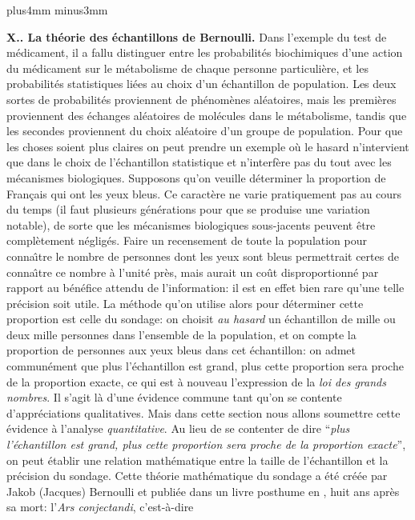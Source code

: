 \vskip8mm plus4mm minus3mm 
 
{\bf X.. La th\'eorie des \'echantillons de Bernoulli.}
\medskip 
Dans l'exemple du test de m\'edicament, il a fallu distinguer entre les 
pro\-ba\-bi\-lit\'es biochimiques d'une action du m\'edicament sur le 
m\'etabolisme de chaque personne particuli\`ere, et les probabilit\'es 
statistiques li\'ees au choix d'un \'echantillon de population. Les deux
sortes de probabilit\'es proviennent de ph\'enom\`enes al\'eatoires, mais
les premi\`eres proviennent des \'echanges al\'eatoires de mol\'ecules
dans le m\'etabolisme, tandis que les secondes pro\-vien\-nent du choix 
al\'eatoire d'un groupe de population. 
\medskip 
Pour que les choses soient plus claires on peut prendre un exemple o\`u
le hasard n'intervient que dans le choix de l'\'echantillon statistique et 
n'interf\`ere pas du tout avec les m\'ecanismes biologiques. Supposons
qu'on veuille d\'eterminer la proportion de Fran\c{c}ais qui ont les yeux 
bleus. Ce caract\`ere ne varie pratiquement pas au cours du temps (il
faut plusieurs g\'en\'erations pour que se produise une variation 
notable), de sorte que les m\'ecanismes biologiques sous-jacents 
peuvent \^etre compl\`etement n\'eglig\'es. Faire un recensement de 
toute la population pour conna{\^\i}tre le nombre de personnes dont les 
yeux sont bleus permettrait certes de conna{\^\i}tre ce nombre \`a 
l'unit\'e pr\`es, mais aurait un co\^ut disproportionn\'e par rapport au 
b\'en\'efice attendu de l'information: il est en effet bien rare qu'une 
telle pr\'ecision soit utile. La m\'ethode qu'on utilise alors pour 
d\'eterminer cette proportion est celle du sondage: on choisit {\it au 
hasard} un \'echantillon de mille ou deux mille personnes dans 
l'ensemble de la population, et on compte la proportion de personnes aux 
yeux bleus dans cet \'echantillon: on admet commun\'ement que plus 
l'\'echantillon est grand, plus cette proportion sera proche de la 
proportion exacte, ce qui est \`a nouveau l'expression de la {\it loi des 
grands nombres}. Il s'agit l\`a d'une \'evidence commune tant qu'on se 
contente d'appr\'eciations qualitatives. Mais dans cette section nous allons 
soumettre cette \'evidence \`a l'analyse {\it quantitative}. Au lieu de se
contenter de dire ``{\sl plus l'\'echantillon est grand, plus cette proportion 
sera proche de la proportion exacte}'', on peut \'etablir une relation 
math\'ematique entre la taille de l'\'echantillon et la pr\'ecision du 
sondage. Cette th\'eorie math\'ematique du sondage a \'et\'e cr\'e\'ee par 
Jakob (Jacques) Bernoulli et publi\'ee dans un livre posthume en {}, huit ans apr\`es sa mort: l'{\it Ars conjectandi}, c'est-\`a-dire
